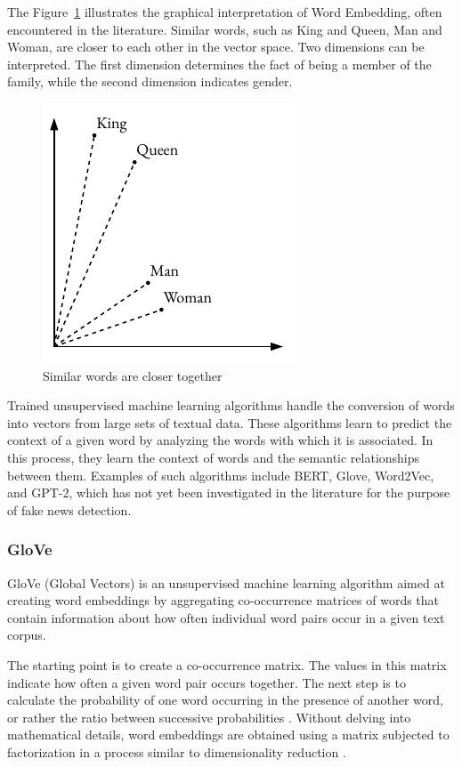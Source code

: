 The Figure~\ref{embedding_example} illustrates the graphical interpretation of Word Embedding, often encountered in the literature. Similar words, such as King and Queen, Man and Woman, are closer to each other in the vector space. Two dimensions can be interpreted. The first dimension determines the fact of being a member of the family, while the second dimension indicates gender.

\begin{figure}[hbt!]
\centering
\includegraphics[width=0.55\linewidth]{embedding_example.pdf}
\caption{Similar words are closer together}
\label{embedding_example}
\end{figure}

Trained unsupervised machine learning algorithms handle the conversion of words into vectors from large sets of textual data. These algorithms learn to predict the context of a given word by analyzing the words with which it is associated. In this process, they learn the context of words and the semantic relationships between them. Examples of such algorithms include BERT, Glove, Word2Vec, and GPT-2, which has not yet been investigated in the literature for the purpose of fake news detection.

\subsubsection{GloVe}
GloVe (Global Vectors) is an unsupervised machine learning algorithm aimed at creating word embeddings by aggregating co-occurrence matrices of words that contain information about how often individual word pairs occur in a given text corpus.

The starting point is to create a co-occurrence matrix. The values in this matrix indicate how often a given word pair occurs together. The next step is to calculate the probability of one word occurring in the presence of another word, or rather the ratio between successive probabilities \autocite{Pennington2014}. Without delving into mathematical details, word embeddings are obtained using a matrix subjected to factorization in a process similar to dimensionality reduction \autocite{Albrecht2020}.

